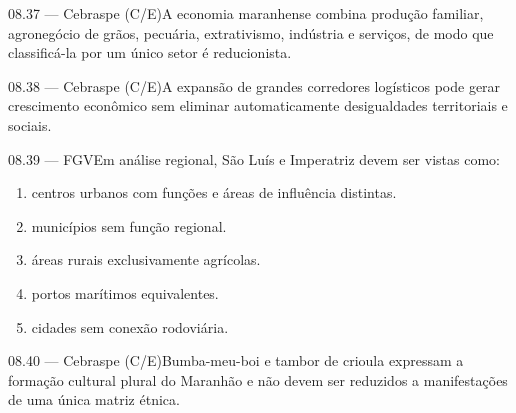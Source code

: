 \begin{questao}{ 08.37 — Cebraspe (C/E)}A economia maranhense combina produção familiar, agronegócio de grãos, pecuária, extrativismo, indústria e serviços, de modo que classificá-la por um único setor é reducionista.\end{questao}
\begin{questao}{ 08.38 — Cebraspe (C/E)}A expansão de grandes corredores logísticos pode gerar crescimento econômico sem eliminar automaticamente desigualdades territoriais e sociais.\end{questao}
\begin{questao}{ 08.39 — FGV}Em análise regional, São Luís e Imperatriz devem ser vistas como:\begin{enumerate}[label=\Alph*)]\item centros urbanos com funções e áreas de influência distintas.\item municípios sem função regional.\item áreas rurais exclusivamente agrícolas.\item portos marítimos equivalentes.\item cidades sem conexão rodoviária.\end{enumerate}\end{questao}
\begin{questao}{ 08.40 — Cebraspe (C/E)}Bumba-meu-boi e tambor de crioula expressam a formação cultural plural do Maranhão e não devem ser reduzidos a manifestações de uma única matriz étnica.\end{questao}

